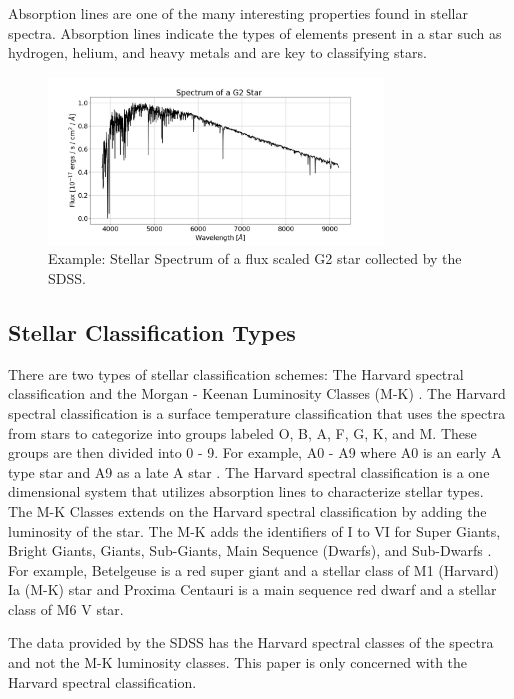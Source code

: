 \documentclass[conference]{IEEEtran}
\begin{document}
	Absorption lines are one of the many interesting properties found in stellar spectra. Absorption lines indicate the types of elements present in a star such as hydrogen, helium, and heavy metals and are key to classifying stars.
        
        \begin{figure}
            \centering
            \includegraphics[width=3.5in]{G2.png}
            \caption{Example: Stellar Spectrum of a flux scaled G2 star collected by the SDSS.}
            \label{fig:G2}
        \end{figure}

	\subsection{Stellar Classification Types}\label{sec:classes}

	There are two types of stellar classification schemes: The Harvard spectral classification and the Morgan - Keenan Luminosity Classes (M-K) \cite{Carroll}. The Harvard spectral classification is a surface temperature classification that uses the spectra from stars to categorize into groups labeled O, B, A, F, G, K, and M. These groups are then divided into 0 - 9. For example, A0 - A9 where A0 is an early A type star and A9 as a late A star \cite{Carroll}. The Harvard spectral classification is a one dimensional system that utilizes absorption lines to characterize stellar types. The M-K Classes extends on the Harvard spectral classification by adding the luminosity of the star. The M-K adds the identifiers of I to VI for Super Giants, Bright Giants, Giants, Sub-Giants, Main Sequence (Dwarfs), and Sub-Dwarfs \cite{Carroll}. For example, Betelgeuse is a red super giant and a stellar class of M1 (Harvard) Ia (M-K) star and Proxima Centauri is a main sequence red dwarf and a stellar class of M6 V star. 
        
        The data provided by the SDSS has the Harvard spectral classes of the spectra and not the M-K luminosity classes. This paper is only concerned with the Harvard spectral classification.
\end{document}

